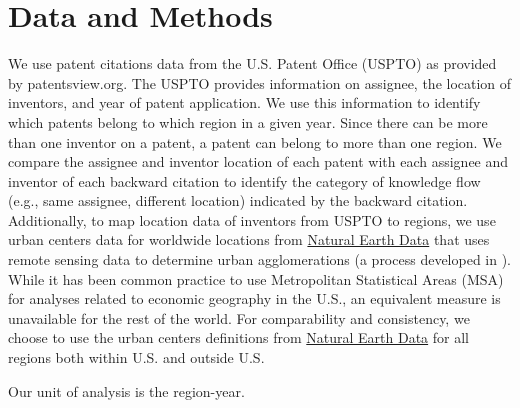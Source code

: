 \documentclass[12pt,letterpaper]{article}
\begin{document}
\section*{Data and Methods}
We use patent citations data from the U.S. Patent Office (USPTO) as provided by patentsview.org. The USPTO provides information on assignee, the location of inventors, and year of patent application. We use this information to identify which patents belong to which region in a given year. Since there can be more than one inventor on a patent, a patent can belong to more than one region. We compare the assignee and inventor location of each patent with each assignee and inventor of each backward citation  to identify the category of knowledge flow (e.g., same assignee, different location) indicated by the backward citation. Additionally, to map location data of inventors from USPTO to regions, we use urban centers data for worldwide locations from \href{http://www.naturalearthdata.com/downloads/10m-cultural-vectors/}{Natural Earth Data} that uses remote sensing data to determine urban agglomerations (a process developed in \citet*{Schneider2003}).  While it has been common practice to use Metropolitan Statistical Areas (MSA) for analyses related to economic geography in the U.S., an equivalent measure is unavailable for the rest of the world. For comparability and consistency, we choose to use the urban centers definitions from \href{http://www.naturalearthdata.com/downloads/10m-cultural-vectors/}{Natural Earth Data} for all regions both within U.S. and outside U.S. \par

Our unit of analysis is the region-year. \par
\end{document}
